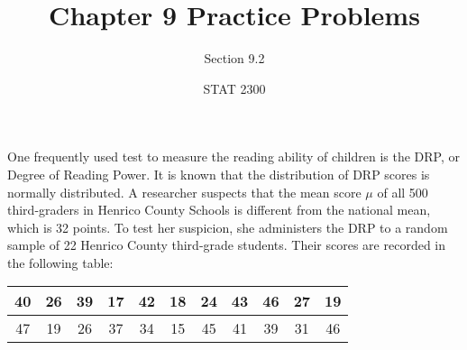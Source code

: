 \documentclass[noanswers]{exam}
\title{Chapter 9 Practice Problems}
\author{Section 9.2}
\date{STAT 2300}
\begin{document}
%

\noindent One frequently used test to measure the reading ability of children is the DRP, or Degree of Reading Power. It is known that the distribution of DRP scores is normally distributed. A researcher suspects that the mean score $\mu$ of all 500 third-graders in Henrico County Schools is different from the national mean, which is 32 points. To test her suspicion, she administers the DRP to a random sample of 22 Henrico County third-grade students. Their scores are recorded in the following table:
    \begin{center}
    \begin{tabular}{|c|c|c|c|c|c|c|c|c|c|c|}
    \hline
        40 & 26 & 39 & 17 & 42 & 18 & 24 & 43 & 46 & 27 & 19 \\
        \hline
        47 & 19 & 26 & 37 & 34 & 15 & 45 & 41 & 39 & 31 & 46 \\
        \hline
    \end{tabular}
    \end{center}
\end{document}
